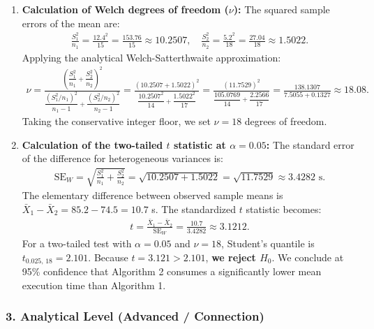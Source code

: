 \begin{solproblema}
	\begin{enumerate}
		\item \textbf{Calculation of Welch degrees of freedom ($\nu$):}
		The squared sample errors of the mean are:
		\begin{align}
			\frac{S_1^2}{n_1} = \frac{12.4^2}{15} = \frac{153.76}{15} \approx 10.2507, \quad \frac{S_2^2}{n_2} = \frac{5.2^2}{18} = \frac{27.04}{18} \approx 1.5022.
		\end{align}
		Applying the analytical Welch-Satterthwaite approximation:
		\begin{align}
			\nu = \frac{\left( \dfrac{S_1^2}{n_1} + \dfrac{S_2^2}{n_2} \right)^2}{\dfrac{(S_1^2 / n_1)^2}{n_1 - 1} + \dfrac{(S_2^2 / n_2)^2}{n_2 - 1}} = \frac{(10.2507 + 1.5022)^2}{\dfrac{10.2507^2}{14} + \dfrac{1.5022^2}{17}} = \frac{(11.7529)^2}{\dfrac{105.0769}{14} + \dfrac{2.2566}{17}} = \frac{138.1307}{7.5055 + 0.1327} \approx 18.08.
		\end{align}
		Taking the conservative integer floor, we set $\nu = 18$ degrees of freedom.
		
		\item \textbf{Calculation of the two-tailed $t$ statistic at $\alpha = 0.05$:}
		The standard error of the difference for heterogeneous variances is:
		\begin{align}
			\text{SE}_W = \sqrt{ \frac{S_1^2}{n_1} + \frac{S_2^2}{n_2} } = \sqrt{ 10.2507 + 1.5022 } = \sqrt{11.7529} \approx 3.4282 \text{ s.}
		\end{align}
		The elementary difference between observed sample means is $\bar{X}_1 - \bar{X}_2 = 85.2 - 74.5 = 10.7$ s. The standardized $t$ statistic becomes:
		\begin{align}
			t = \frac{\bar{X}_1 - \bar{X}_2}{\text{SE}_W} = \frac{10.7}{3.4282} \approx 3.1212.
		\end{align}
		For a two-tailed test with $\alpha = 0.05$ and $\nu = 18$, Student's quantile is $t_{0.025, \, 18} = 2.101$.
		Because $t = 3.121 > 2.101$, \textbf{we reject $H_0$}. We conclude at 95\% confidence that Algorithm 2 consumes a significantly lower mean execution time than Algorithm 1.
	\end{enumerate}
\end{solproblema}

\subsubsection*{3. Analytical Level (Advanced / Connection)}

